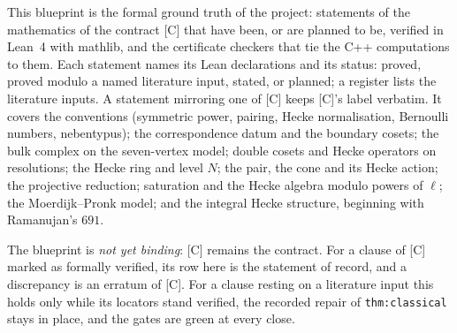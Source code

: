 This blueprint is the formal ground truth of the project: statements of the mathematics of the contract [C] that have
been, or are planned to be, verified in Lean~4 with mathlib, and the certificate checkers that tie the C++ computations
to them. Each statement names its Lean declarations and its status: proved, proved modulo a named literature input,
stated, or planned; a register lists the literature inputs. A statement mirroring one of [C] keeps [C]'s label verbatim.
It covers the conventions (symmetric power, pairing, Hecke normalisation, Bernoulli numbers, nebentypus); the
correspondence datum and the boundary cosets; the bulk complex on the seven-vertex model; double cosets and Hecke
operators on resolutions; the Hecke ring and level $N$; the pair, the cone and its Hecke action; the projective
reduction; saturation and the Hecke algebra modulo powers of $\ell$; the Moerdijk--Pronk model; and the integral Hecke
structure, beginning with Ramanujan's $691$.

The blueprint is \emph{not yet binding}: [C] remains the contract. For a clause of [C] marked as formally verified, its
row here is the statement of record, and a discrepancy is an erratum of [C]. For a clause resting on a literature input
this holds only while its locators stand verified, the recorded repair of \texttt{thm:classical} stays in place, and
the gates are green at every close.
